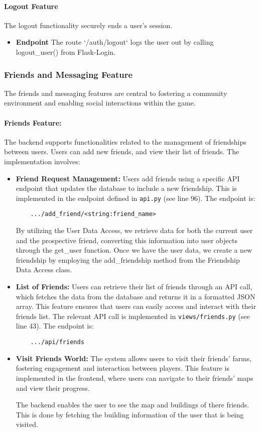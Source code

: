 \documentclass[12pt]{article}
\begin{document}
\paragraph{Logout Feature}
The logout functionality securely ends a user's session.
\begin{itemize}
    \item \textbf{Endpoint} The route `/auth/logout` logs the user out by calling logout\_user() from Flask-Login.
\end{itemize}
\subsubsection{Friends and Messaging Feature}
The friends and messaging features are central to fostering a community environment and enabling social interactions within the game.
\paragraph{Friends Feature:}
The backend supports functionalities related to the management of friendships between users. Users can add new friends, and view their list of friends. The implementation involves:
\begin{itemize}
    \item \textbf{Friend Request Management:} Users add friends using a specific API endpoint that updates the database to include a new friendship. This is implemented in the endpoint defined in \texttt{api.py} (see line 96). The endpoint is:
    \begin{verbatim}
    .../add_friend/<string:friend_name>
    \end{verbatim}
    By utilizing the User Data Access, we retrieve data for both the current user and the prospective friend, converting this information into user objects through the get\_user function. Once we have the user data, we create a new friendship by employing the add\_friendship method from the Friendship Data Access class.
    \item \textbf{List of Friends:} Users can retrieve their list of friends through an API call, which fetches the data from the database and returns it in a formatted JSON array. This feature ensures that users can easily access and interact with their friends list. The relevant API call is implemented in \texttt{views/friends.py} (see line 43). The endpoint is:
    \begin{verbatim}
    .../api/friends
    \end{verbatim}
    \item \textbf{Visit Friends World:} The system allows users to visit their friends' farms, fostering engagement and interaction between players. This feature is implemented in the frontend, where users can navigate to their friends' maps and view their progress.

    The backend enables the user to see the map and buildings of there friends. This is done by fetching the building information of the user that is being visited.

\end{itemize}
\end{document}
